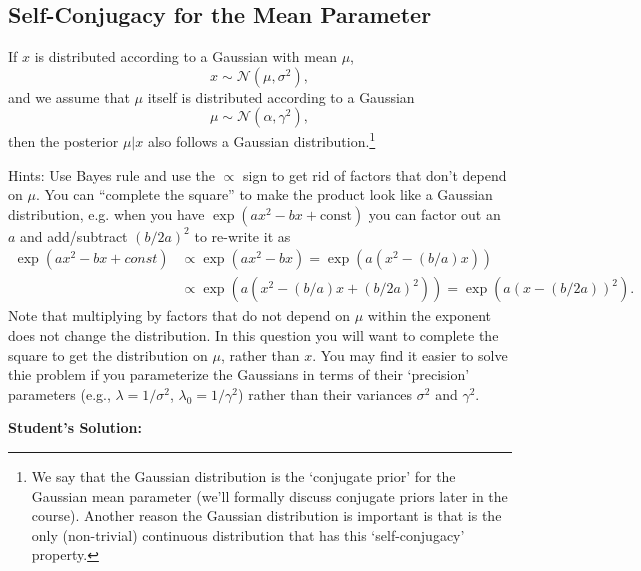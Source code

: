\documentclass{article}
\begin{document}
\subsection{Self-Conjugacy for the Mean Parameter}

If $x$ is distributed according to a Gaussian with mean $\mu$,
\[
x \sim \mathcal{N}(\mu,\sigma^2),
\]
and we assume that $\mu$ itself is distributed according to a Gaussian
\[
\mu \sim \mathcal{N}(\alpha,\gamma^2),
\]
then the posterior $\mu | x$ also follows a Gaussian distribution.\footnote{We say that the Gaussian distribution is the `conjugate prior' for the Gaussian mean parameter (we'll formally discuss conjugate priors later in the course). Another reason the Gaussian distribution is important is that is the only (non-trivial) continuous distribution that has this `self-conjugacy' property.}  %

Hints: Use Bayes rule and use the $\propto$ sign to get rid of factors that don't depend on $\mu$. You can ``complete the square'' to make the product look like a Gaussian distribution, e.g. when you have $\exp(ax^2 - bx + \text{const})$ you can factor out an $a$ and add/subtract $(b/2a)^2$ to re-write it as
\begin{align*}
\exp\left(ax^2 - bx + const\right) & \propto
\exp\left(ax^2 - bx\right) = \exp\left(a(x^2 - (b/a)x)\right) \\& \propto \exp\left(a(x^2 - (b/a)x + (b/2a)^2)\right) =  \exp\left(a(x - (b/2a))^2\right).
\end{align*}
Note that multiplying by factors that do not depend on $\mu$ within the exponent does not change the distribution. In this question you will want to complete the square to get the distribution on $\mu$, rather than $x$.
You may find it easier to solve thie problem if you parameterize the Gaussians in terms of their `precision' parameters (e.g., $\lambda = 1/\sigma^2$, $\lambda_0 = 1/\gamma^2$) rather than their variances $\sigma^2$ and $\gamma^2$.

\newpage

\textbf{Student's Solution:}
\end{document}
